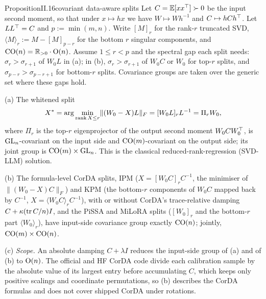 \begin{restate}{Proposition}{II.16}{covariant data-aware splits}
Let $C=\mathbb E[xx^{\top}]\succ0$ be the input second moment, so that under $x\mapsto hx$ we have $W\mapsto Wh^{-1}$ and
$C\mapsto hCh^{\top}$. Let $LL^{\top}=C$ and $p:=\min(m,n)$. Write $[M]_r$ for the rank-$r$ truncated SVD,
$\langle M\rangle_r:=M-[M]_{p-r}$ for the bottom $r$ singular components, and $\mathrm{CO}(n)=\mathbb{R}_{>0}\cdot\mathrm{O}(n)$. Assume
$1\le r<p$ and the spectral gap each split needs: $\sigma_r>\sigma_{r+1}$ of $W_0L$ in (a); in (b),
$\sigma_r>\sigma_{r+1}$ of $W_0C$ or $W_0$ for top-$r$ splits, and $\sigma_{p-r}>\sigma_{p-r+1}$ for bottom-$r$ splits.
Covariance groups are taken over the generic set where these gaps hold.

(a) The whitened split
\begin{equation*}
  X^*=\arg\min_{\operatorname{rank} X\le r}\lVert(W_0-X)L\rVert_F=[W_0L]_rL^{-1}=\Pi_rW_0,
\end{equation*}
where $\Pi_r$ is the top-$r$ eigenprojector of the output second moment $W_0CW_0^{\top}$, is $\mathrm{GL}_n$-covariant on the input
side and $\mathrm{CO}(m)$-covariant on the output side; its joint group is $\mathrm{CO}(m)\times\mathrm{GL}_n$. This is the classical
reduced-rank-regression (SVD-LLM) solution.

(b) The formula-level CorDA splits, IPM ($X=[W_0C]_rC^{-1}$, the minimiser of $\lVert(W_0-X)C\rVert_F$) and KPM (the
bottom-$r$ components of $W_0C$ mapped back by $C^{-1}$, $X=\langle W_0C\rangle_rC^{-1}$), with or without CorDA's
trace-relative damping $C+\kappa(\operatorname{tr} C/n)I$, and the PiSSA and MiLoRA splits ($[W_0]_r$ and the bottom-$r$ part
$\langle W_0\rangle_r$), have input-side covariance group exactly $\mathrm{CO}(n)$; jointly, $\mathrm{CO}(m)\times\mathrm{CO}(n)$.

(c) \emph{Scope.} An absolute damping $C+\lambda I$ reduces the input-side group of (a) and of (b) to $\mathrm{O}(n)$. The
official and HF CorDA code divide each calibration sample by the absolute value of its largest entry before
accumulating $C$, which keeps only positive scalings and coordinate permutations, so (b) describes the CorDA formulas and
does not cover shipped CorDA under rotations.
\end{restate}

